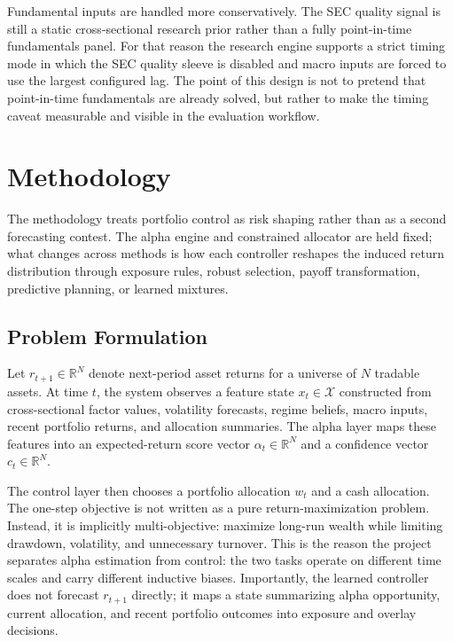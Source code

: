 \documentclass[10pt,twocolumn]{article}
\begin{document}
Fundamental inputs are handled more conservatively. The SEC quality signal is
still a static cross-sectional research prior rather than a fully point-in-time
fundamentals panel. For that reason the research engine supports a strict timing
mode in which the SEC quality sleeve is disabled and macro inputs are forced to
use the largest configured lag. The point of this design is not to pretend that
point-in-time fundamentals are already solved, but rather to make the timing
caveat measurable and visible in the evaluation workflow.

\section{Methodology}

The methodology treats portfolio control as risk shaping rather than as a
second forecasting contest. The alpha engine and constrained allocator are held
fixed; what changes across methods is how each controller reshapes the induced
return distribution through exposure rules, robust selection, payoff
transformation, predictive planning, or learned mixtures.

\subsection{Problem Formulation}

Let $r_{t+1} \in \mathbb{R}^N$ denote next-period asset returns for a universe of
$N$ tradable assets. At time $t$, the system observes a feature state
$x_t \in \mathcal{X}$ constructed from cross-sectional factor values,
volatility forecasts, regime beliefs, macro inputs, recent portfolio returns,
and allocation summaries. The alpha layer maps these features into an
expected-return score vector $\alpha_t \in \mathbb{R}^N$ and a confidence
vector $c_t \in \mathbb{R}^N$.

The control layer then chooses a portfolio allocation $w_t$ and a cash
allocation. The one-step objective is not written as a pure return-maximization
problem. Instead, it is implicitly multi-objective: maximize long-run wealth
while limiting drawdown, volatility, and unnecessary turnover. This is the
reason the project separates alpha estimation from control: the two tasks
operate on different time scales and carry different inductive biases.
Importantly, the learned controller does not forecast $r_{t+1}$ directly; it
maps a state summarizing alpha opportunity, current allocation, and recent
portfolio outcomes into exposure and overlay decisions.
\end{document}
